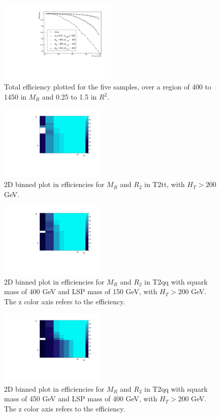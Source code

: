 \documentclass[twocolumn,aps,prd,reprint]{revtex4-1}
\begin{document}
\begin{figure}[h]
 \includegraphics[width=0.5\textwidth]{efficiency.pdf}
\caption{\label{fig:eff_total} Total efficiency plotted for the five samples, over a region of 400 to 1450 in $M_R$ and 0.25 to 1.5 in $R^2$.}
\end{figure}
\begin{figure}
 \includegraphics[width=0.45\textwidth]{ht200_file0.pdf}
\caption{\label{fig:eff_t2tt} 2D binned plot in efficiencies for $M_R$ and $R_2$ in T2tt, with $H_T>200$ GeV.}
\end{figure}
\begin{figure}
 \includegraphics[width=0.45\textwidth]{ht200_file1.pdf}
\caption{\label{fig:eff_t211} 2D binned plot in efficiencies for $M_R$ and $R_2$ in T2qq with squark mass of 400 GeV and LSP mass of 150 GeV, with $H_T>200$ GeV. The z color axis refers to the efficiency.}
\end{figure}
\begin{figure}
 \includegraphics[width=0.45\textwidth]{ht200_file2.pdf}
\caption{\label{fig:eff_t2com} 2D binned plot in efficiencies for $M_R$ and $R_2$ in T2qq with squark mass of 450 GeV and LSP mass of 400 GeV, with $H_T>200$ GeV. The z color axis refers to the efficiency.}
\end{figure}
\end{document}
